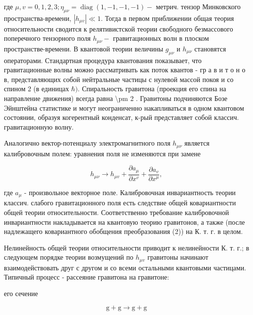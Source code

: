 \documentclass[10pt]{article}
\begin{document}
где $\mu, v=0,1,2,3 ; \eta_{\mu \nu}=\operatorname{diag}(1,-1,-1,-1)-$ метрич. тензор Минковского пространства-времени, $\left|h_{\mu v}\right| \ll 1$. Тогда в первом приближении общая теория относительности сводится к релятивистской теории свободного безмассового поперечного тензорного поля $h_{\mu \nu}-$ гравитационных волн в плоском пространстве-времени. В квантовой теории величины $g_{\mu \nu}$ и $h_{\mu \nu}$ становятся операторами. Стандартная процедура квантования показывает, что гравитационные волны можно рассматривать как поток квантов - гр а в и т о н о в, представляющих собой нейтральные частицы с нулевой массой покоя и со спином 2 (в единицах $\hbar)$. Спиральность гравитона (проекция его спина на направление движения) всегда равна \textbackslash pm 2 . Гравитоны подчиняются Бозе Эйнштейна статистике и могут неограниченно накапливаться в одном квантовом состоянии, образуя когерентный конденсат, к-рый представляет собой классич. гравитационную волну.



Аналогично вектор-потенциалу электромагнитного поля $h_{\mu \nu}$ является калибровочным полем: уравнения поля не изменяются при замене



\[

h_{\mu \nu} \rightarrow h_{\mu v}+\frac{\partial a_{\mu}}{\partial x^{v}}+\frac{\partial a_{v}}{\partial x^{\mu}},

\]



где $a_{\mu}$ - произвольное векторное поле. Калибровочная инвариантность теории классич. слабого гравитационного поля есть следствие общей ковариантности общей теории относительности. Соответственно требование калибровочной инвариантности накладывается на квантовую теорию гравитонов, а также (после надлежащего ковариантного обобщения преобразования (2)) на К. т. г. в целом.



Нелинейность общей теории относительности приводит к нелинейности К. т. г.; в следующем порядке теории возмущений по $h_{\mu v}$ гравитоны начинают взаимодействовать друг с другом и со всеми остальными квантовыми частицами. Типичный процесс - рассеяние гравитона на гравитоне:



его сечение



\[

\mathrm{g}+\mathrm{g} \rightarrow \mathrm{g}+\mathrm{g}

\]
\end{document}
